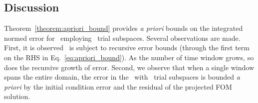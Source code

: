 \begin{comment}
Thus we have,
$$ \intSlabArg{n} \norm{ \stateROMSolArgt{n}{t} - \stateROMStarSolArgt{n}{t}} = \DeltaSlabArg{n} \errorArgt{n}{\timeStartArg{n}}.$$
Inserting the above into~\eqref{eq:boundtmp},
\begin{equation*}
\intSlabArg{n} \norm{\errorArgt{n}{t}} dt \le \DeltaSlabArg{n} \norm{\errorArgt{n}{\timeStartArg{n}}  }   + \lipshitzi \intSlabArg{n} \norm{ \resid(\stateFOMProjSolArgt{n}{t}) } dt.
\end{equation*}
\end{proof}
\end{comment}
\subsection{Discussion} 
Theorem~\ref{theorem:apriori_bound} provides \textit{a priori} bounds on the integrated normed error for \methodAcronym\ employing \spatialAcronym\ trial subspaces. Several 
observations are made. First, it is observed \methodAcronym\ is subject to recursive error bounds (through the first term on the RHS in Eq.~\eqref{eq:apriori_bound}). As the number of time window grows, so does the recursive growth of error. Second, we observe that when a single window spans the entire domain, the error in the \methodAcronym\ with \spatialAcronym\ trial subspaces is bounded \textit{a priori} by the initial condition error and the residual of the projected FOM solution. 
%

